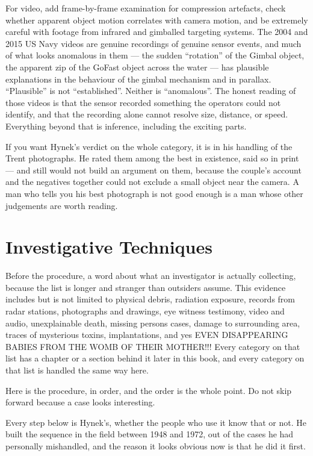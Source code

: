 For video, add frame-by-frame examination for compression artefacts, check whether apparent
object motion correlates with camera motion, and be extremely careful with footage from
infrared and gimballed targeting systems. The 2004 and 2015 US Navy videos are genuine
recordings of genuine sensor events, and much of what looks anomalous in them --- the
sudden ``rotation'' of the Gimbal object, the apparent zip of the GoFast object across the
water --- has plausible explanations in the behaviour of the gimbal mechanism and in
parallax. ``Plausible'' is not ``established''. Neither is ``anomalous''. The honest
reading of those videos is that the sensor recorded something the operators could not
identify, and that the recording alone cannot resolve size, distance, or speed. Everything
beyond that is inference, including the exciting parts.

If you want Hynek's verdict on the whole category, it is in his handling of the Trent
photographs. He rated them among the best in existence, said so in print --- and still would not
build an argument on them, because the couple's account and the negatives together could not
exclude a small object near the camera. A man who tells you his best photograph is not good
enough is a man whose other judgements are worth reading.

\section{Investigative Techniques}\label{sec:investigativetechniques}

Before the procedure, a word about what an investigator is actually collecting, because the
list is longer and stranger than outsiders assume. This evidence includes but is not limited
to physical debris, radiation exposure, records from radar stations, photographs and drawings,
eye witness testimony, video and audio, unexplainable death, missing persons cases, damage to
surrounding area, traces of mysterious toxins, implantations, and yes EVEN DISAPPEARING BABIES
FROM THE WOMB OF THEIR MOTHER!!! Every category on that list has a chapter or a section behind
it later in this book, and every category on that list is handled the same way here.

Here is the procedure, in order, and the order is the whole point. Do not skip forward
because a case looks interesting.

Every step below is Hynek's, whether the people who use it know that or not. He built the
sequence in the field between 1948 and 1972, out of the cases he had personally mishandled, and
the reason it looks obvious now is that he did it first.

